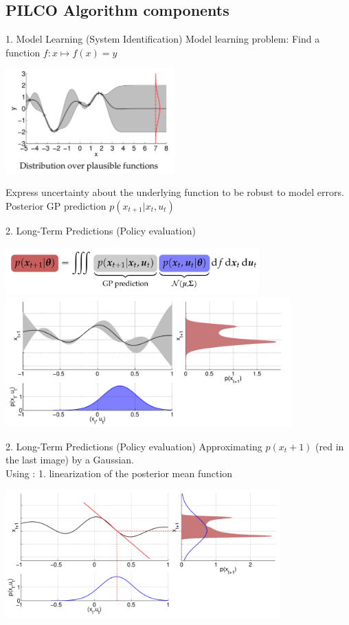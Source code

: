 \documentclass{beamer}
\begin{document}
\subsection{PILCO Algorithm components}
\begin{frame}{1. Model Learning (System Identification)}
    Model learning problem: Find a function $f:x \mapsto f(x)=y$
    \begin{center}
        \includegraphics[height=4cm]{img/modellearning.png}
    \end{center}
    Express uncertainty about the underlying function to be robust to model errors. Posterior GP prediction $p(x_{t+1}|x_t,u_t)$
\end{frame}

\begin{frame}{2. Long-Term Predictions (Policy evaluation)}
    \begin{center}
        \includegraphics[height=1.8cm]{img/ltd-eq.png}\\
        \includegraphics[height=5cm]{img/ltp.png}
    \end{center}
\end{frame}

\begin{frame}{2. Long-Term Predictions (Policy evaluation)}
Approximating $p(x_t+1)$ (red in the last image) by a Gaussian.\\
Using : 1. linearization of the posterior mean function
\begin{center}
    \includegraphics[height=5cm]{img/lin.png}
\end{center}
\end{frame}
\end{document}
